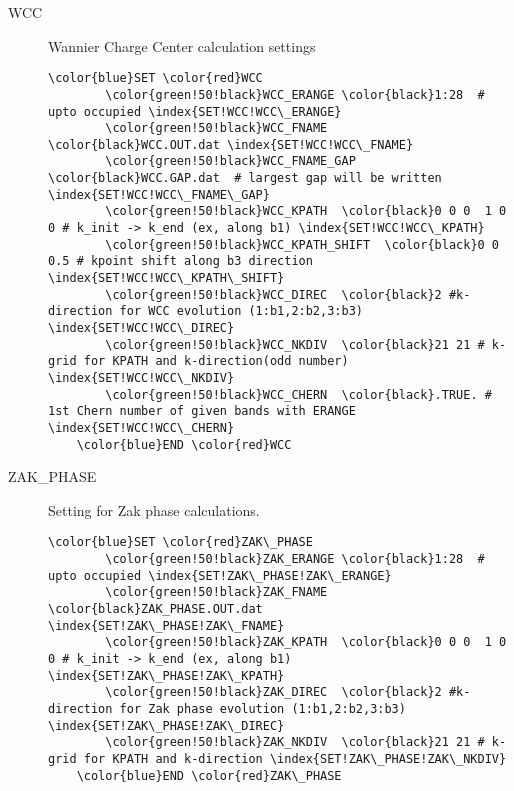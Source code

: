 \documentclass[a4paper,12pt]{scrartcl}
\makeatletter
\def\namedlabel#1#2{\begingroup
    #2%
    \def\@currentlabel{#2}%
    \phantomsection\label{#1}\endgroup
}
\makeatother
\begin{document}
\begin{description}
    \item[\namedlabel{tag:WCC}{WCC}]  Wannier Charge Center calculation settings
 \begin{Verbatim}[commandchars=\\\{\},gobble=4, frame=single, framesep=2mm, 
    label= Wannier charge center (WCC) setup: kz 0.5 (shift),
    labelposition=bottomline]
    \color{blue}SET \color{red}WCC
        \color{green!50!black}WCC_ERANGE \color{black}1:28  # upto occupied \index{SET!WCC!WCC\_ERANGE}
        \color{green!50!black}WCC_FNAME  \color{black}WCC.OUT.dat \index{SET!WCC!WCC\_FNAME}
        \color{green!50!black}WCC_FNAME_GAP \color{black}WCC.GAP.dat  # largest gap will be written \index{SET!WCC!WCC\_FNAME\_GAP}
        \color{green!50!black}WCC_KPATH  \color{black}0 0 0  1 0 0 # k_init -> k_end (ex, along b1) \index{SET!WCC!WCC\_KPATH}
        \color{green!50!black}WCC_KPATH_SHIFT  \color{black}0 0 0.5 # kpoint shift along b3 direction \index{SET!WCC!WCC\_KPATH\_SHIFT}
        \color{green!50!black}WCC_DIREC  \color{black}2 #k-direction for WCC evolution (1:b1,2:b2,3:b3) \index{SET!WCC!WCC\_DIREC}
        \color{green!50!black}WCC_NKDIV  \color{black}21 21 # k-grid for KPATH and k-direction(odd number) \index{SET!WCC!WCC\_NKDIV}
        \color{green!50!black}WCC_CHERN  \color{black}.TRUE. # 1st Chern number of given bands with ERANGE \index{SET!WCC!WCC\_CHERN}
    \color{blue}END \color{red}WCC
 \end{Verbatim}


 	\item[\namedlabel{tag:ZAKPHASE}{ZAK\_PHASE}] 
		Setting for Zak phase calculations. 

 \begin{Verbatim}[commandchars=\\\{\},gobble=4, frame=single, framesep=2mm, 
    label= Zak phase setup,
    labelposition=bottomline]
    \color{blue}SET \color{red}ZAK\_PHASE
        \color{green!50!black}ZAK_ERANGE \color{black}1:28  # upto occupied \index{SET!ZAK\_PHASE!ZAK\_ERANGE}
        \color{green!50!black}ZAK_FNAME  \color{black}ZAK_PHASE.OUT.dat  \index{SET!ZAK\_PHASE!ZAK\_FNAME}
        \color{green!50!black}ZAK_KPATH  \color{black}0 0 0  1 0 0 # k_init -> k_end (ex, along b1) \index{SET!ZAK\_PHASE!ZAK\_KPATH}
        \color{green!50!black}ZAK_DIREC  \color{black}2 #k-direction for Zak phase evolution (1:b1,2:b2,3:b3) \index{SET!ZAK\_PHASE!ZAK\_DIREC}
        \color{green!50!black}ZAK_NKDIV  \color{black}21 21 # k-grid for KPATH and k-direction \index{SET!ZAK\_PHASE!ZAK\_NKDIV}
    \color{blue}END \color{red}ZAK\_PHASE
 \end{Verbatim}


\end{description}
\end{document}
